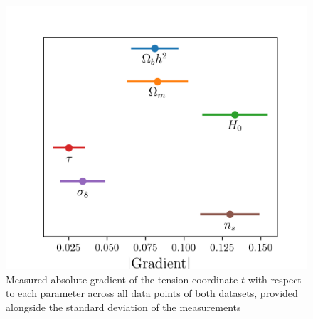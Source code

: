 \documentclass[%
 reprint,
 amsmath,amssymb,
 aps,
]{revtex4-2}
\begin{document}
\begin{figure}
    \includegraphics[width=0.8\columnwidth]{../plots/grads.png}
    \centering
    \caption{Measured absolute gradient of the tension coordinate $t$ with respect to each parameter across all data points of both datasets, provided alongside the standard deviation of the measurements}
    \label{fig:grad}
\end{figure}
\end{document}
